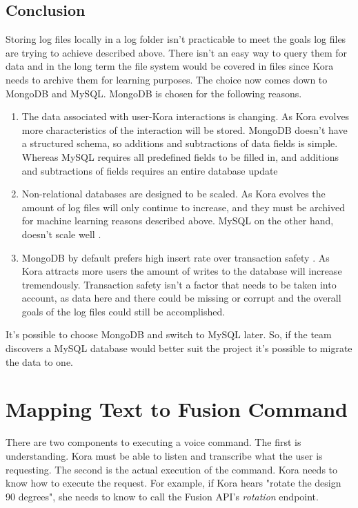 \documentclass[onecolumn, draftclsnofoot,10pt, compsoc]{IEEEtran}
\begin{document}
		\subsection{Conclusion}
			Storing log files locally in a log folder isn't practicable to meet the goals log files are trying to achieve described above.
			There isn't an easy way to query them for data and in the long term the file system would be covered in files since Kora needs to archive them for learning purposes.
			The choice now comes down to MongoDB and MySQL.
			MongoDB is chosen for the following reasons.
			\begin{enumerate}
				\item{
					The data associated with user-Kora interactions is changing.
					As Kora evolves more characteristics of the interaction will be stored.
					MongoDB doesn't have a structured schema, so additions and subtractions of data fields is simple.
					Whereas MySQL requires all predefined fields to be filled in, and additions and subtractions of fields requires an entire database update}
				\item{
					Non-relational databases are designed to be scaled.
					As Kora evolves the amount of log files will only continue to increase, and they must be archived for machine learning reasons described above. 
					MySQL on the other hand, doesn't scale well \cite{SQLvsNoSQLsitepoint}.}
				\item{
					MongoDB by default prefers high insert rate over transaction safety \cite{SQLvsNoSQLupwork}.
					As Kora attracts more users the amount of writes to the database will increase tremendously.
					Transaction safety isn't a factor that needs to be taken into account, as data here and there could be missing or corrupt and the overall goals of the log files could still be accomplished.}
			\end{enumerate}
			
			It's possible to choose MongoDB and switch to MySQL later.
			So, if the team discovers a MySQL database would better suit the project it's possible to migrate the data to one. 



	
	\section{Mapping Text to Fusion Command}
			There are two components to executing a voice command. 
			The first is understanding.
			Kora must be able to listen and transcribe what the user is requesting.
			The second is the actual execution of the command.
			Kora needs to know how to execute the request. 
			For example, if Kora hears "rotate the design 90 degrees", she needs to know to call the Fusion API's \textit{rotation} endpoint.
			
\end{document}
